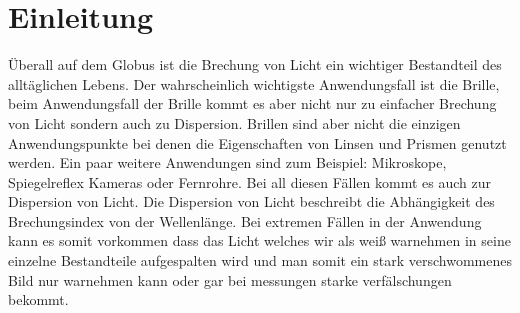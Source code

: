 \section{Einleitung}

Überall auf dem Globus ist die Brechung von Licht ein wichtiger 
Bestandteil des alltäglichen Lebens. Der wahrscheinlich wichtigste 
Anwendungsfall ist die Brille, beim Anwendungsfall der Brille kommt es 
aber nicht nur zu einfacher Brechung von Licht sondern auch zu 
Dispersion. Brillen sind aber nicht die einzigen Anwendungspunkte bei 
denen die Eigenschaften von Linsen und Prismen genutzt werden. Ein paar 
weitere Anwendungen sind zum Beispiel: Mikroskope, Spiegelreflex Kameras 
oder Fernrohre. Bei all diesen Fällen kommt es auch zur Dispersion von 
Licht. Die Dispersion von Licht beschreibt die Abhängigkeit des 
Brechungsindex von der Wellenlänge. Bei extremen Fällen in der 
Anwendung kann es somit vorkommen dass das Licht welches wir als 
weiß warnehmen in seine einzelne Bestandteile aufgespalten wird und man 
somit ein stark verschwommenes Bild nur warnehmen kann oder gar bei 
messungen starke verfälschungen bekommt.